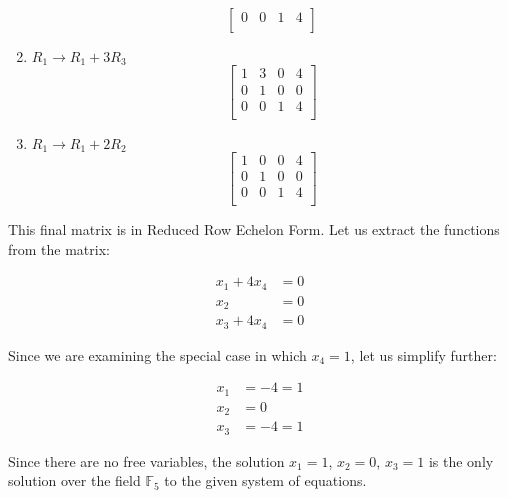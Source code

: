 \documentclass{article}
\newcommand{\F}{\mathbb{F}}
\begin{document}
\begin{enumerate}
\[\begin{bmatrix}
                  0 & 0 & 1 & 4 \\
              \end{bmatrix}
          \]
    \item $R_1 \to R_1 + 3R_3$
          \[
              \begin{bmatrix}
                  1 & 3 & 0 & 4 \\
                  0 & 1 & 0 & 0 \\
                  0 & 0 & 1 & 4 \\
              \end{bmatrix}
          \]
    \item $R_1 \to R_1 + 2R_2$
          \[
              \begin{bmatrix}
                  1 & 0 & 0 & 4 \\
                  0 & 1 & 0 & 0 \\
                  0 & 0 & 1 & 4 \\
              \end{bmatrix}
          \]
\end{enumerate}

This final matrix is in Reduced Row Echelon Form. Let us extract the functions from the matrix: 

\begin{align*}
    x_1 + 4x_4 &= 0\\
    x_2 &= 0\\
    x_3 + 4x_4 &= 0
\end{align*}

Since we are examining the special case in which $x_4 = 1$, let us simplify further: 

\begin{align*}
    x_1 &= - 4 = 1\\
    x_2 &= 0\\
    x_3 &= -4 = 1
\end{align*}

Since there are no free variables, the solution $x_1 = 1$, $x_2 = 0$, $x_3 = 1$ is the only solution over the field $\F_5$ to the given system of equations. 
\end{document}
